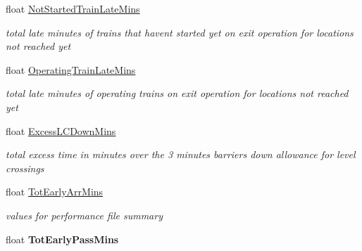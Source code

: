 \begin{DoxyCompactItemize}
\mbox{\label{class_t_train_controller_a095d7c99ffc21a6939a044bbad4fa18f}} 
float \mbox{\hyperlink{class_t_train_controller_a095d7c99ffc21a6939a044bbad4fa18f}{Not\+Started\+Train\+Late\+Mins}}
\begin{DoxyCompactList}\small\item\em total late minutes of trains that haven\textquotesingle{}t started yet on exit operation for locations not reached yet \end{DoxyCompactList}\item 
\mbox{\label{class_t_train_controller_af25f4d9be4644eab1e042751b1738f98}} 
float \mbox{\hyperlink{class_t_train_controller_af25f4d9be4644eab1e042751b1738f98}{Operating\+Train\+Late\+Mins}}
\begin{DoxyCompactList}\small\item\em total late minutes of operating trains on exit operation for locations not reached yet \end{DoxyCompactList}\item 
\mbox{\label{class_t_train_controller_a2b18964f752a0241c45514b82c51e647}} 
float \mbox{\hyperlink{class_t_train_controller_a2b18964f752a0241c45514b82c51e647}{Excess\+L\+C\+Down\+Mins}}
\begin{DoxyCompactList}\small\item\em total excess time in minutes over the 3 minutes barriers down allowance for level crossings \end{DoxyCompactList}\item 
\mbox{\label{class_t_train_controller_a2904fbc7f4b39c555ea83b325f630d59}} 
float \mbox{\hyperlink{class_t_train_controller_a2904fbc7f4b39c555ea83b325f630d59}{Tot\+Early\+Arr\+Mins}}
\begin{DoxyCompactList}\small\item\em values for performance file summary \end{DoxyCompactList}\item 
\mbox{\label{class_t_train_controller_a464315be2825c7e4528b886b2da28bfb}} 
float {\bfseries Tot\+Early\+Pass\+Mins}
\item 
\mbox{\label{class_t_train_controller_afb22af38b090588a1334002fcf0c390e}} 

\end{DoxyCompactItemize}
